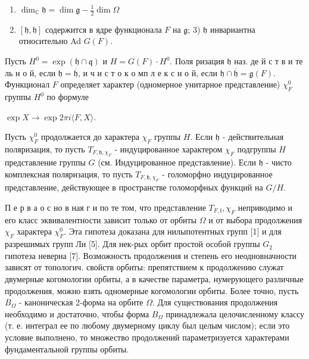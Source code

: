 \documentclass[10pt]{article}
\begin{document}
\begin{enumerate}

  \item $\operatorname{dim}_{\mathbb{C}} \mathfrak{h}=\operatorname{dim} \mathfrak{g}-\frac{1}{2} \operatorname{dim} \Omega$



  \item $[\mathfrak{h}, \mathfrak{h}]$ содержится в ядре функционала $F$ на $\mathfrak{g}$; 3) $\mathfrak{h}$ инвариантна относительно Ad $G(F)$.



\end{enumerate}



Пусть $H^{0}=\exp (\mathfrak{h} \cap \mathfrak{q})$ и $H=G(F) \cdot H^{0}$. Поля ризация $\mathfrak{h}$ наз. де й с т в и те ль н о й, если $\mathfrak{h}=\overline{\mathfrak{h}}$, и ч и с т о к о мп л е к с н о й, если $\mathfrak{h} \cap \overline{\mathfrak{h}}=\mathfrak{g}(F)$. Функционал $F$ определяет характер (одномерное унитарное представление) $\chi_{F}^{0}$ группы $H^{0}$ по формуле



$\exp X \longrightarrow \exp 2 \pi i\langle F, X\rangle$.



Пусть $\chi_{F}^{0}$ продолжается до характера $\chi_{F}$ группы $H$. Если $\mathfrak{h}$ - действительная поляризация, то пусть $T_{F, \mathfrak{h}, \chi_{F}}$ - индуцированное характером $\chi_{F}$ подгруппы $H$ представление группы $G$ (см. Индуцированное представление). Если $\mathfrak{h}$ - чисто комплексная поляризация, то пусть $T_{F, \mathfrak{h}, \chi_{F}}$ - голоморфно индуцированное представление, действующее в пространстве голоморфных функций на $G / H$.



П е р в а о с но в ная г и по те том, что представление $T_{F, \mathfrak{l}}, \chi_{F}$ неприводимо и его класс эквивалентности зависит только от орбиты $\Omega$ и от выбора продолжения $\chi_{F}$ характера $\chi_{F}^{0}$. Эта гипотеза доказана для нилыпотентных групп [1] и для разрешимых групп Ли [5]. Для нек-рых орбит простой особой группы $G_{2}$ гипотеза неверна [7]. Возможность продолжения и степень его неодновначности зависят от топологич. свойств орбиты: препятствием к продолжению служат двумерные когомологии орбиты, а в качестве параметра, нумерующего различные продолжения, можно взять одномерные когомологии орбиты. Более точно, пусть $B_{\Omega}$ - каноническая 2-форма на орбите $\Omega$. Для существования продолжения необходимо и достаточно, чтобы форма $B_{\Omega}$ принадлежала целочисленному классу (т. е. интеграл ее по любому двумерному циклу был целым числом); если это условие выполнено, то множество продолжений параметризуется характерами фундаментальной группы орбиты.
\end{document}
